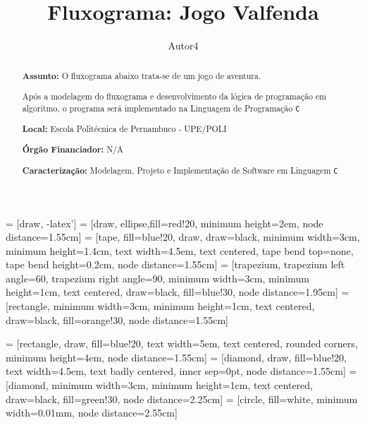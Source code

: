 \documentclass[a4paper,12pt]{article} %
\title{Fluxograma: Jogo Valfenda}
\author{Autor4}
\begin{document}
\maketitle


 = [draw, -latex']
 = [draw, ellipse,fill=red!20, minimum height=2em, node distance=1.55cm]
 = [tape, fill=blue!20, draw, draw=black, minimum width=3cm, minimum height=1.4cm, text width=4.5em, text centered, tape bend top=none, tape bend height=0.2cm, node distance=1.55cm]
 = [trapezium, trapezium left angle=60, trapezium right angle=90, minimum width=3cm, minimum height=1cm, text centered, draw=black, fill=blue!30, node distance=1.95cm]
 = [rectangle, minimum width=3cm, minimum height=1cm, text centered, draw=black, fill=orange!30, node distance=1.55cm]

 = [rectangle, draw, fill=blue!20, text width=5em, text centered, rounded corners, minimum height=4em, node distance=1.55cm]
 = [diamond, draw, fill=blue!20, text width=4.5em, text badly centered, inner sep=0pt, node distance=1.55cm]
 = [diamond, minimum width=3cm, minimum height=1cm, text centered, draw=black, fill=green!30, node distance=2.25cm]
 = [circle, fill=white, minimum width=0.01mm, node distance=2.55cm]


\begin{abstract}

\textbf{Assunto:} O fluxograma abaixo trata-se de um jogo de aventura.

Após a modelagem do fluxograma e desenvolvimento da lógica de programação em algoritmo,
o programa será implementado na Linguagem de Programação \texttt{C}


\textbf{Local:} Escola Politécnica de Pernambuco - UPE/POLI

\textbf{Órgão Financiador:} N/A

\textbf{Caracterização:} Modelagem, Projeto e Implementação de Software em Linguagem \texttt{C}


\end{abstract}
\end{document}
